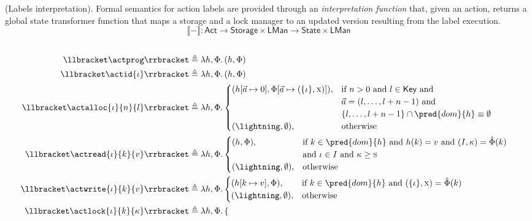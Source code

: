 \begin{defn}
	\label{defn:actLabels}
	(Labels interpretation).
	Formal semantics for action labels are provided through an \emph{interpretation function} that, given an action, returns a global state transformer function that maps a storage and a lock manager to an updated version resulting from the label execution.
	\[
		\llbracket - \rrbracket
			:
		\mathsf{Act} \rightarrow
		\mathsf{Storage} \times \mathsf{LMan} \rightarrow
		\mathsf{State} \times \mathsf{LMan}
	\]
	\begin{align*}\\
		\llbracket \actprog \rrbracket &\triangleq \lambda h, \Phi \ldotp (h,\Phi) \\
		\llbracket \actid{\iota} \rrbracket &\triangleq \lambda h, \Phi \ldotp (h,\Phi) \\
		\llbracket \actalloc{\iota}{n}{l} \rrbracket &\triangleq \lambda h, \Phi \ldotp
			\begin{cases}
				(h[\vec{a} \mapsto 0], \Phi[\vec{a} \mapsto (\{ \iota \}, \textsc{x})]),
				&
				\text{if } n > 0 \text{ and } l \in \mathsf{Key} \text{ and } \\
				& \vec{a} = (l, \ldots, l + n - 1) \text{ and } \\
				& \{ l, \ldots, l + n - 1 \} \cap \pred{dom}{h} \equiv \emptyset \\
				(\lightning, \emptyset), & \text{otherwise}
			\end{cases}
	\\
	\llbracket \actread{\iota}{k}{v} \rrbracket &\triangleq \lambda h, \Phi \ldotp
	\begin{cases}
	(h, \Phi), & \text{if } k \in \pred{dom}{h} \text{ and } h(k) = v \text{ and } (I, \kappa) = \hat{\Phi}(k) \\ & \text{and } \iota \in I \text{ and } \kappa \geq \textsc{s} \\
	(\lightning, \emptyset), & \text{otherwise}
	\end{cases} \\
	\llbracket \actwrite{\iota}{k}{v} \rrbracket &\triangleq \lambda h, \Phi \ldotp
	\begin{cases}
	(h[k \mapsto v], \Phi), & \text{if } k \in \pred{dom}{h} \text{ and } (\{\iota\}, \textsc{x}) = \hat{\Phi}(k) \\
	(\lightning, \emptyset), & \text{otherwise}
	\end{cases} \\
	\llbracket \actlock{\iota}{k}{\kappa} \rrbracket &\triangleq \lambda h, \Phi \ldotp
	\begin{cases}

\end{cases}
\end{align*}
\end{defn}

